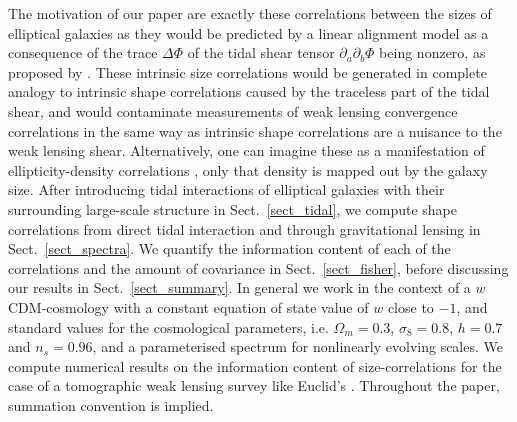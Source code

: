 \documentclass[a4paper,fleqn,usenatbib]{mnras}
\begin{document}
The motivation of our paper are exactly these correlations between the sizes of elliptical galaxies as they would be predicted by a linear alignment model as a consequence of the trace $\Delta\Phi$ of the tidal shear tensor $\partial_a\partial_b\Phi$ being nonzero, as proposed by \citet{hirata_galaxy-galaxy_2004, hirata_intrinsic_2010}. These intrinsic size correlations would be generated in complete analogy to intrinsic shape correlations caused by the traceless part of the tidal shear, and would contaminate measurements of weak lensing convergence correlations \citep{alsing_weak_2014} in the same way as intrinsic shape correlations are a nuisance to the weak lensing shear. Alternatively, one can imagine these as a manifestation of ellipticity-density correlations \citep{hui_intrinsic/extrinsic_2002}, only that density is mapped out by the galaxy size. After introducing tidal interactions of elliptical galaxies with their surrounding large-scale structure in Sect.~\ref{sect_tidal}, we compute shape correlations from direct tidal interaction and through gravitational lensing in Sect.~\ref{sect_spectra}. We quantify the information content of each of the correlations and the amount of covariance in Sect.~\ref{sect_fisher}, before discussing our results in Sect.~\ref{sect_summary}. In general we work in the context of a $w$CDM-cosmology with a constant equation of state value of $w$ close to $-1$, and standard values for the cosmological parameters, i.e. $\Omega_m = 0.3$, $\sigma_8 =  0.8$, $h = 0.7$ and $n_s = 0.96$, and a parameterised spectrum for nonlinearly evolving scales. We compute numerical results on the information content of size-correlations for the case of a tomographic weak lensing survey like Euclid's \citep{Amendola:2016saw}. Throughout the paper, summation convention is implied.


\end{document}
